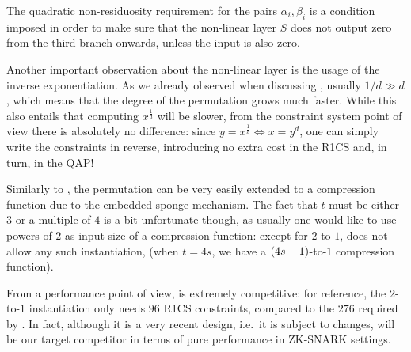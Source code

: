 The quadratic non-residuosity requirement for the pairs \(\alpha_i, \beta_i\) is a condition 
imposed in order to make sure that the non-linear layer \(S\) does not output zero from the third 
branch onwards, unless the input is also zero.

Another important observation about the non-linear layer is the usage of the inverse exponentiation.
As we already observed when discussing \Mimc, usually \(1/d \gg d\), which means that the degree 
of the permutation grows much faster. 
While this also entails that computing \(x^{\frac{1}{d}}\) will be slower, from the constraint 
system point of view there is absolutely no difference: since \(y = x^{\frac{1}{d}} \iff x = y^{d}\),
one can simply write the constraints in reverse, introducing no extra cost in the R1CS and, 
in turn, in the QAP\@!

Similarly to \Poseidon, the \Griffin{} permutation can be very easily extended to a compression 
function due to the embedded sponge mechanism. The fact that \(t\) must be either \(3\) or a 
multiple of \(4\) is a bit unfortunate though, as usually one would like to use powers of \(2\) as 
input size of a compression function: except for \(2\)-to-\(1\), \Griffin{} does not allow any 
such instantiation, (when \(t = 4s\), we have a \(\Parens*{4s-1}\)-to-\(1\) compression function).

From a performance point of view, \Griffin{} is extremely competitive: for reference, the 
\(2\)-to-\(1\) instantiation only needs \(96\) R1CS constraints, compared to the \(276\) required 
by \Poseidon.
In fact, although it is a very recent design, i.e.\ it is subject to changes, \Griffin{} will be 
our target competitor in terms of pure performance in ZK-SNARK settings.

